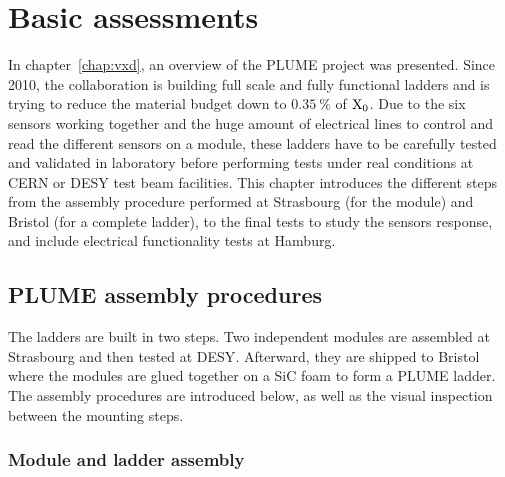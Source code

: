 \chapter{Basic assessments}
\label{chap:labTests}

  In chapter~\ref{chap:vxd}, an overview of the \gls{PLUME} project was presented.
  Since 2010, the collaboration is building full scale and fully functional ladders and is trying to reduce the material budget down to $0.35~\%$ of $\rm{X_{0}}$.
  Due to the six sensors working together and the huge amount of electrical lines to control and read the different sensors on a module, these ladders have to be carefully tested and validated in laboratory before performing tests under real conditions at \gls{CERN} or \gls{DESY} test beam facilities.
  This chapter introduces the different steps from the assembly procedure performed at Strasbourg (for the module) and Bristol (for a complete ladder), to the final tests to study the sensors response, and include electrical functionality tests at Hamburg.
 
 \minitoc
  

\section{PLUME assembly procedures}

  The ladders are built in two steps. 
  Two independent modules are assembled at Strasbourg and then tested at \gls{DESY}. 
  Afterward, they are shipped to Bristol where the modules are glued together on a \gls{SiC} foam to form a \gls{PLUME} ladder.
  The assembly procedures are introduced below, as well as the visual inspection between the mounting steps.

  \subsection{Module and ladder assembly}

